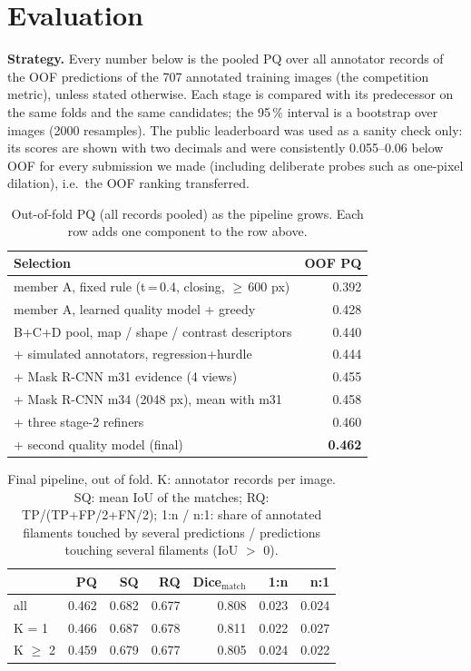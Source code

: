 \documentclass[sigconf]{acmart}
\begin{document}
\section{Evaluation}\label{sec:evaluation}
\textbf{Strategy.} Every number below is the pooled PQ over all annotator records of the OOF predictions of the 707 annotated training images (the competition metric), unless stated otherwise. Each stage is compared with its predecessor on the same folds and the same candidates; the 95\,\% interval is a bootstrap over images (2000 resamples). The public leaderboard was used as a sanity check only: its scores are shown with two decimals and were consistently 0.055--0.06 below OOF for every submission we made (including deliberate probes such as one-pixel dilation), i.e.\ the OOF ranking transferred.

\begin{table}[t]
  \caption{Out-of-fold PQ (all records pooled) as the pipeline grows. Each row adds one component to the row above.}
  \label{tab:ablation}
  \small
  \begin{tabular}{lr}
    \toprule
    Selection & OOF PQ \\
    \midrule
    member A, fixed rule (t\,=\,0.4, closing, $\geq$\,600 px) & 0.392 \\
    member A, learned quality model + greedy & 0.428 \\
    \midrule
    B+C+D pool, map / shape / contrast descriptors & 0.440 \\
    \quad + simulated annotators, regression+hurdle & 0.444 \\
    \quad + Mask R-CNN m31 evidence (4 views) & 0.455 \\
    \quad + Mask R-CNN m34 (2048 px), mean with m31 & 0.458 \\
    \quad + three stage-2 refiners & 0.460 \\
    \quad + second quality model (final) & \textbf{0.462} \\
    \bottomrule
  \end{tabular}
\end{table}

\begin{table}[t]
  \caption{Final pipeline, out of fold. K: annotator records per image. SQ: mean IoU of the matches; RQ: TP/(TP+FP/2+FN/2); 1:n / n:1: share of annotated filaments touched by several predictions / predictions touching several filaments (IoU $>$ 0).}
  \label{tab:final}
  \small
  \begin{tabular}{lrrrrrr}
    \toprule
     & PQ & SQ & RQ & Dice$_\text{match}$ & 1:n & n:1 \\
    \midrule
    all & 0.462 & 0.682 & 0.677 & 0.808 & 0.023 & 0.024 \\
    K = 1 & 0.466 & 0.687 & 0.678 & 0.811 & 0.022 & 0.027 \\
    K $\geq$ 2 & 0.459 & 0.679 & 0.677 & 0.805 & 0.024 & 0.022 \\
    \bottomrule
  \end{tabular}
\end{table}
\end{document}
